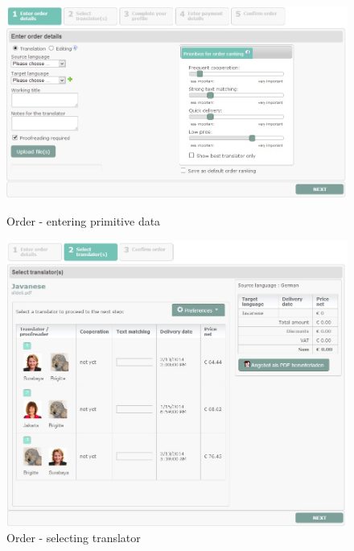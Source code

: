 \begin{figure}[h]
\begin{center}
\includegraphics[scale=\figurescaling]{figures/order-1.jpg}
\caption{Order - entering primitive data
\label{fig:order-1}}
\includegraphics[scale=\figurescaling]{figures/order-2.jpg}
\caption{Order - selecting translator
\label{fig:order-2}}
\end{center}
\end{figure}

